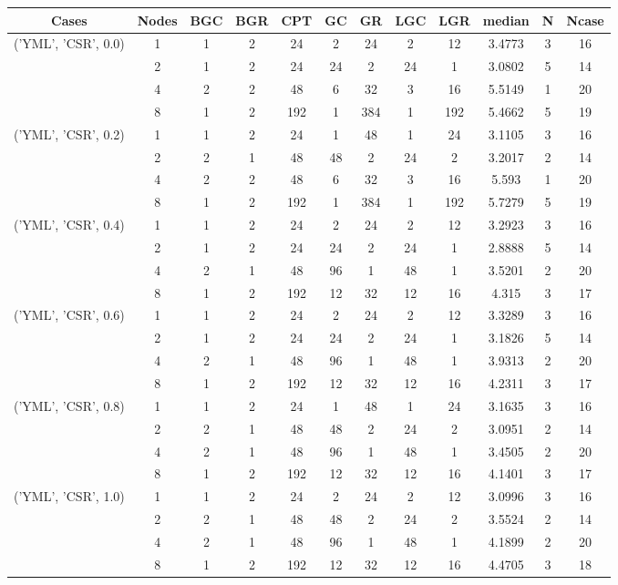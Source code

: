 \begin{tabular}{cccccccccccc}
\hline
Cases & Nodes& BGC& BGR& CPT& GC& GR& LGC& LGR& median & N & Ncase \\
\hline
\multirow{4}{*}{('YML', 'CSR', 0.0)}& 1& 1& 2& 24& 2& 24& 2& 12& 3.4773& 3& 16\\
& 2& 1& 2& 24& 24& 2& 24& 1& 3.0802& 5& 14\\
& 4& 2& 2& 48& 6& 32& 3& 16& 5.5149& 1& 20\\
& 8& 1& 2& 192& 1& 384& 1& 192& 5.4662& 5& 19\\
\hline
\multirow{4}{*}{('YML', 'CSR', 0.2)}& 1& 1& 2& 24& 1& 48& 1& 24& 3.1105& 3& 16\\
& 2& 2& 1& 48& 48& 2& 24& 2& 3.2017& 2& 14\\
& 4& 2& 2& 48& 6& 32& 3& 16& 5.593& 1& 20\\
& 8& 1& 2& 192& 1& 384& 1& 192& 5.7279& 5& 19\\
\hline
\multirow{4}{*}{('YML', 'CSR', 0.4)}& 1& 1& 2& 24& 2& 24& 2& 12& 3.2923& 3& 16\\
& 2& 1& 2& 24& 24& 2& 24& 1& 2.8888& 5& 14\\
& 4& 2& 1& 48& 96& 1& 48& 1& 3.5201& 2& 20\\
& 8& 1& 2& 192& 12& 32& 12& 16& 4.315& 3& 17\\
\hline
\multirow{4}{*}{('YML', 'CSR', 0.6)}& 1& 1& 2& 24& 2& 24& 2& 12& 3.3289& 3& 16\\
& 2& 1& 2& 24& 24& 2& 24& 1& 3.1826& 5& 14\\
& 4& 2& 1& 48& 96& 1& 48& 1& 3.9313& 2& 20\\
& 8& 1& 2& 192& 12& 32& 12& 16& 4.2311& 3& 17\\
\hline
\multirow{4}{*}{('YML', 'CSR', 0.8)}& 1& 1& 2& 24& 1& 48& 1& 24& 3.1635& 3& 16\\
& 2& 2& 1& 48& 48& 2& 24& 2& 3.0951& 2& 14\\
& 4& 2& 1& 48& 96& 1& 48& 1& 3.4505& 2& 20\\
& 8& 1& 2& 192& 12& 32& 12& 16& 4.1401& 3& 17\\
\hline
\multirow{4}{*}{('YML', 'CSR', 1.0)}& 1& 1& 2& 24& 2& 24& 2& 12& 3.0996& 3& 16\\
& 2& 2& 1& 48& 48& 2& 24& 2& 3.5524& 2& 14\\
& 4& 2& 1& 48& 96& 1& 48& 1& 4.1899& 2& 20\\
& 8& 1& 2& 192& 12& 32& 12& 16& 4.4705& 3& 18\\
\hline
\end{tabular}



